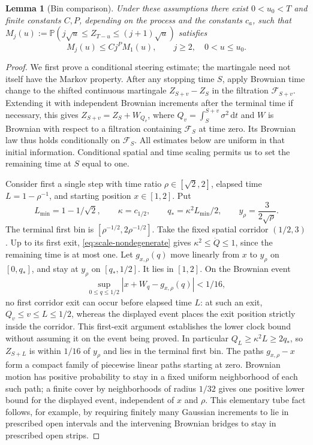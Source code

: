 \documentclass[11pt,a4paper]{article}
\numberwithin{equation}{section}
\newtheorem{lemma}[theorem]{Lemma}
\theoremstyle{definition}
\theoremstyle{remark}
\newcommand{\Prob}{\mathbb P}
\newcommand{\dd}{\mathrm d}
\begin{document}
\begin{lemma}[Bin comparison]\label{lem:scale-bins}
Under these assumptions there exist $0<u_0<T$ and finite constants
$C,P$, depending on the process and the constants $c_a$, such that
$M_j(u):=\Prob(j\sqrt u\le Z_{T-u}\le(j+1)\sqrt u)$ satisfies
\begin{equation}\label{eq:src27}
 M_j(u)\le Cj^P M_1(u),\qquad j\ge2,\quad 0<u\le u_0.
\end{equation}
\end{lemma}
\begin{proof}
We first prove a conditional steering estimate; the martingale need
not itself have the Markov property. After any stopping time
$S$, apply Brownian time change to the shifted continuous martingale
$Z_{S+v}-Z_S$ in the filtration $\mathcal F_{S+v}$. Extending it with
independent Brownian increments after the terminal time if necessary,
this gives $Z_{S+v}=Z_S+W_{Q_v}$, where
$Q_v=\int_S^{S+v}\sigma^2\,\dd t$ and $W$ is Brownian with respect
to a filtration containing $\mathcal F_S$ at time zero. Its Brownian
law thus holds conditionally on $\mathcal F_S$. All estimates below
are uniform in that initial information. Conditional spatial and time
scaling permits us to set the remaining time at $S$ equal to one.

Consider first a single step with time ratio
$\rho\in[\sqrt2,2]$, elapsed time $L=1-\rho^{-1}$, and starting
position $x\in[1,2]$. Put
\[
 L_{\min}=1-1/\sqrt2,\qquad \kappa=c_{1/2},\qquad
 q_* =\kappa^2L_{\min}/2,\qquad y_\rho=\frac{3}{2\sqrt\rho}.
\]
The terminal first bin is $[\rho^{-1/2},2\rho^{-1/2}]$.
Take the fixed spatial corridor $(1/2,3)$. Up to its first exit,
\eqref{eq:scale-nondegenerate} gives $\kappa^2\le\dot Q\le1$,
since the remaining time is at most one. Let $g_{x,\rho}(q)$ move
linearly from $x$ to $y_\rho$ on $[0,q_*]$, and stay at $y_\rho$
on $[q_*,1/2]$. It lies in $[1,2]$. On the Brownian event
\[
 \sup_{0\le q\le1/2}|x+W_q-g_{x,\rho}(q)|<1/16,
\]
no first corridor exit can occur before elapsed time $L$: at such an
exit, $Q_v\le v\le L\le1/2$, whereas the displayed event places
the exit position strictly inside the corridor. This first-exit
argument establishes the lower clock bound without assuming it on
the event being proved. In particular $Q_L\ge\kappa^2L\ge2q_*$,
so $Z_{S+L}$ is within $1/16$ of $y_\rho$ and lies in the terminal
first bin. The paths $g_{x,\rho}-x$ form a compact family of
piecewise linear paths starting at zero. Brownian motion has positive
probability to stay in a fixed uniform neighborhood of each such
path; a finite cover by neighborhoods of radius $1/32$ gives one
positive lower bound for the displayed event, independent of $x$
and $\rho$. This elementary tube fact follows, for example, by
requiring finitely many Gaussian increments to lie in prescribed open
intervals and the intervening Brownian bridges to stay in prescribed
open strips.


\end{proof}
\end{document}
